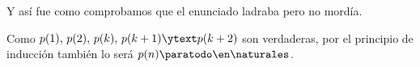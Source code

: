 Y así fue como comprobamos que el enunciado ladraba pero no mordía.\medskip

Como $p(1),\, p(2),\, p(k),\, p(k+1) \ytext p(k+2)$ son verdaderas, por el principio de inducción
también lo será $p(n) \paratodo \en \naturales$.

\begin{aportes}
  \item {}
\end{aportes}
